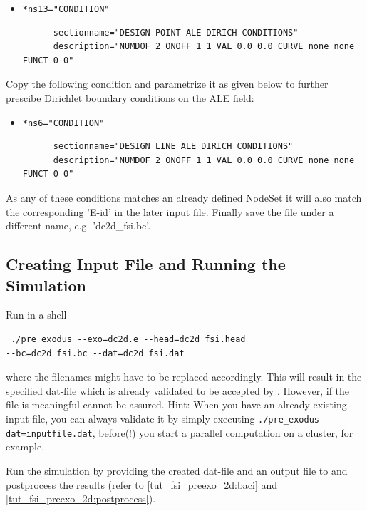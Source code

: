\begin{itemize}
  \item \verb|*ns13="CONDITION"| \qquad
  \begin{small} \begin{verbatim}
      sectionname="DESIGN POINT ALE DIRICH CONDITIONS"
      description="NUMDOF 2 ONOFF 1 1 VAL 0.0 0.0 CURVE none none FUNCT 0 0"
    \end{verbatim}
   \end{small}
\end{itemize}
   
Copy the following condition and parametrize it as given below to further
prescibe Dirichlet boundary conditions on the ALE field:
   
\begin{itemize}
  \item \verb|*ns6="CONDITION"| \qquad
  \begin{small} \begin{verbatim}
      sectionname="DESIGN LINE ALE DIRICH CONDITIONS"
      description="NUMDOF 2 ONOFF 1 1 VAL 0.0 0.0 CURVE none none FUNCT 0 0"
    \end{verbatim}
   \end{small}
\end{itemize}   

As any of these conditions matches an already defined NodeSet it will also match
the corresponding 'E-id' in the later \baci{} input file.
Finally save the file under a different name, e.g. 'dc2d\_fsi.bc'.

\subsection{Creating \baci{} Input File and Running the Simulation}
Run in a shell \begin{verbatim} ./pre_exodus --exo=dc2d.e --head=dc2d_fsi.head
--bc=dc2d_fsi.bc --dat=dc2d_fsi.dat\end{verbatim} where the filenames might have
to be replaced accordingly. This will result in the specified dat-file which is already validated to be accepted by \baci{}. However, if the file is meaningful cannot be assured. Hint: When you have an already existing input file, you can
always validate it by simply executing \verb|./pre_exodus --dat=inputfile.dat|,
before(!) you start a parallel \baci{} computation on a cluster, for example. \newline

Run the simulation by providing the created dat-file and an output file to
\baci{} and postprocess the results (refer to \ref{tut_fsi_preexo_2d:baci} and
\ref{tut_fsi_preexo_2d:postprocess}).

